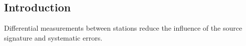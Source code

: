 \renewcommand{\pmk}{Yuan\_2016\_GJI\_Double-difference adjoint tomography}
\renewcommand{\prf}{FWI/\pmk.pdf}
\renewcommand{\pti}{Double-difference adjoint seismic tomography}
\renewcommand{\pay}{Yanhua O. Yuan, Frederik J. Simons and Jeroen Tromp, 2016}
\renewcommand{\pjo}{Geophys. J. Int.}
\renewcommand{\pda}{2019/8/25 Sun.}

\section{\pinfo}

\subsection{Introduction}
Differential measurements between stations reduce the influence of
the source signature and systematic errors.


